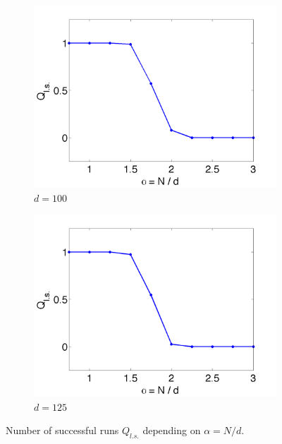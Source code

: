 \begin{figure}
	\begin{subfigure}{0.48\textwidth}
		\centering
		\includegraphics[width=\textwidth]{./img/Ab_N100_nd75_nmax250}
		\caption{$d=100$}
		\label{fig:2:experiment:N100}
	\end{subfigure}	
	\begin{subfigure}{0.48\textwidth}
		\centering
		\includegraphics[width=\textwidth]{./img/Ab_N125_nd75_nmax250}
		\caption{$d=125$}
		\label{fig:2:experiment:N125}
	\end{subfigure}
	\caption{Number of successful runs $Q_{l.s.}$ depending on $\alpha = N / d$.}
	\label{fig:2:experiment}
\end{figure}



